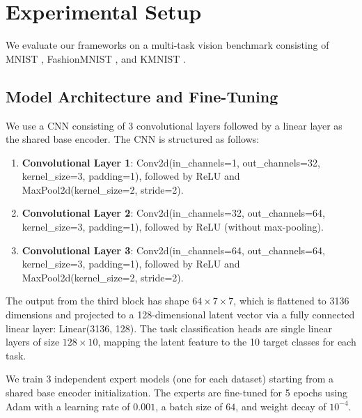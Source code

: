 \documentclass{article}
\begin{document}
\section{Experimental Setup}
\label{sec:exp}
We evaluate our frameworks on a multi-task vision benchmark consisting of MNIST \cite{lecun89mnist}, FashionMNIST \cite{xiao17fashion}, and KMNIST \cite{clanuwat18kmnist}.

\subsection{Model Architecture and Fine-Tuning}
We use a CNN consisting of 3 convolutional layers followed by a linear layer as the shared base encoder. The CNN is structured as follows:
\begin{enumerate}
    \item \textbf{Convolutional Layer 1}: Conv2d(in\_channels=1, out\_channels=32, kernel\_size=3, padding=1), followed by ReLU and MaxPool2d(kernel\_size=2, stride=2).
    \item \textbf{Convolutional Layer 2}: Conv2d(in\_channels=32, out\_channels=64, kernel\_size=3, padding=1), followed by ReLU (without max-pooling).
    \item \textbf{Convolutional Layer 3}: Conv2d(in\_channels=64, out\_channels=64, kernel\_size=3, padding=1), followed by ReLU and MaxPool2d(kernel\_size=2, stride=2).
\end{enumerate}
The output from the third block has shape $64 \times 7 \times 7$, which is flattened to 3136 dimensions and projected to a 128-dimensional latent vector via a fully connected linear layer: Linear(3136, 128). The task classification heads are single linear layers of size $128 \times 10$, mapping the latent feature to the 10 target classes for each task.

We train 3 independent expert models (one for each dataset) starting from a shared base encoder initialization. The experts are fine-tuned for 5 epochs using Adam with a learning rate of $0.001$, a batch size of $64$, and weight decay of $10^{-4}$.
\end{document}
